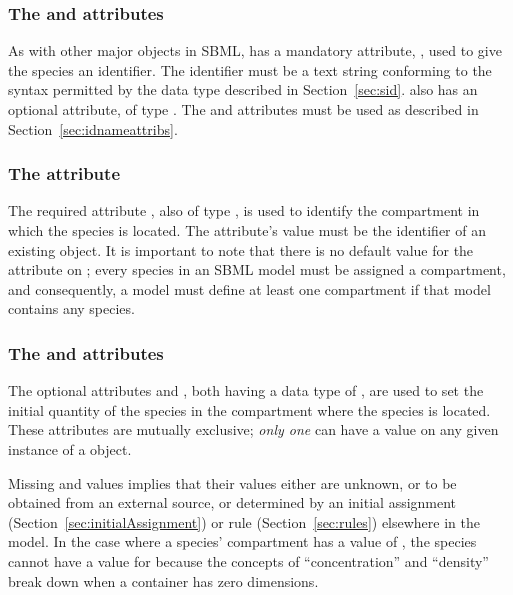\subsubsection{The  and  attributes}

As with other major objects in SBML, \Species has a mandatory
attribute, , used to give the species an identifier.  The
identifier must be a text string conforming to the syntax
permitted by the  data type described in
Section~\ref{sec:sid}.  \Species also has an optional 
attribute, of type .  The  and 
attributes must be used as described in
Section~\ref{sec:idnameattribs}.



\subsubsection{The  attribute}
\label{sec:species-compartment}

The required attribute , also of type
, is used to identify the compartment in which the
species is located.  The attribute's value must be the identifier of
an existing \Compartment object.  It is important to note that
there is no default value for the  attribute on
\Species; every species in an SBML model must be assigned a
compartment, and consequently, a model must define at least one
compartment if that model contains any species.


\subsubsection{The  and
   attributes}
\label{sec:initialAmount}

The optional attributes  and
, both having a data type of
, are used to set the initial quantity of the
species in the compartment where the species is located.  These
attributes are mutually exclusive; \ie \emph{only one} can have a
value on any given instance of a \Species object.

Missing  and 
values implies that their values either are unknown, or to be
obtained from an external source, or determined by an initial
assignment (Section~\ref{sec:initialAssignment}) or rule
(Section~\ref{sec:rules}) elsewhere in the model.  In the case
where a species' compartment has a  value
of , the species cannot have a value for
 because the concepts of
``concentration'' and ``density'' break down when a container has
zero dimensions.

